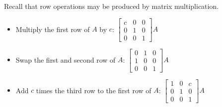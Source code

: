 \begin{remark}
Recall that row operations may be produced by matrix multiplication.
\begin{itemize}
\item Multiply the first row of \(A\) by \(c\): \(
  \begin{bmatrix}
  c & 0 & 0 \\
  0 & 1 & 0 \\
  0 & 0 & 1
  \end{bmatrix}A
\)
\item Swap the first and second row of \(A\): \(
  \begin{bmatrix}
  0 & 1 & 0 \\
  1 & 0 & 0 \\
  0 & 0 & 1
  \end{bmatrix}A
\)
\item Add \(c\) times the third row to the first row of \(A\): \(
  \begin{bmatrix}
  1 & 0 & c \\
  0 & 1 & 0 \\
  0 & 0 & 1
  \end{bmatrix}A
\)
\end{itemize}
\end{remark}


